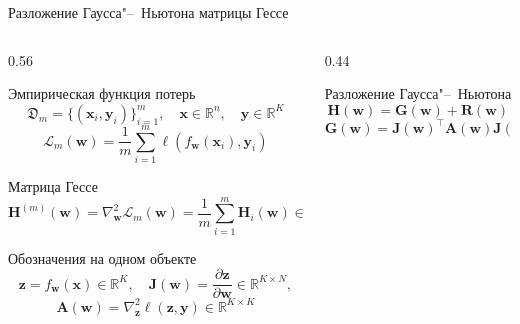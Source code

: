 \documentclass[aspectratio=169]{beamer}
\begin{document}
\begin{frame}{Разложение Гаусса"--~Ньютона матрицы Гессе}
\begin{columns}[T]
    \begin{column}{0.56\textwidth}
        \begin{block}{Эмпирическая функция потерь}
            \vspace{-0.6em}
            \[
                \mathfrak D_m=\{(\mathbf x_i,\mathbf y_i)\}_{i=1}^m,
                \quad \mathbf{x} \in \mathbb{R}^{n},
                \quad \mathbf{y} \in \mathbb{R}^{K}
            \]
            \[
                \mathcal L_m(\mathbf w)=\frac1m\sum_{i=1}^m \ell(f_{\mathbf w}(\mathbf x_i),\mathbf y_i)
            \]
            \vspace{-1.8em}
        \end{block}
        \begin{block}{Матрица Гессе}
            \vspace{-1.8em}
            \[
                \mathbf H^{(m)}(\mathbf w)
                =
                \nabla_{\mathbf w}^2 \mathcal L_m(\mathbf w)
                =
                \frac1m\sum_{i=1}^m \mathbf H_i(\mathbf w)
                \in \mathbb{R}^{N \times N}
            \]
            \vspace{-1.8em}
        \end{block}
        \begin{block}{Обозначения на одном объекте}
            \vspace{-1.8em}
            \[
                \mathbf z=f_{\mathbf w}(\mathbf x) \in \mathbb{R}^{K},\quad
                \mathbf J(\mathbf w)=\frac{\partial \mathbf z}{\partial \mathbf w} \in \mathbb{R}^{K \times N},
            \]
            \[
                \mathbf A(\mathbf w)=\nabla_{\mathbf z}^2 \ell(\mathbf z,\mathbf y) \in \mathbb{R}^{K \times K}
            \]
            \vspace{-1.2em}
        \end{block}
    \end{column}
    \begin{column}{0.44\textwidth}
        \begin{block}{Разложение Гаусса"--~Ньютона}
            \vspace{-0.6em}
            \[
                \mathbf H(\mathbf w)=\mathbf G(\mathbf w)+\mathbf R(\mathbf w)
            \]
            \[
                \mathbf G(\mathbf w)=\mathbf J(\mathbf w)^\top \mathbf A(\mathbf w)\mathbf J(\mathbf w)
            \]
            \[
\]
\end{block}
\end{column}
\end{columns}
\end{frame}
\end{document}
